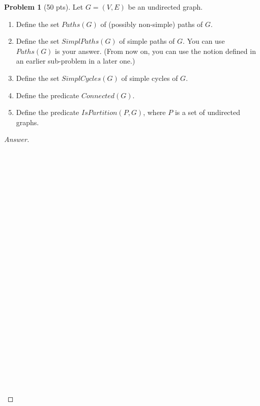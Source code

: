\documentclass[11pt,a4paper,oneside,microtype,nokorean]{oblivoir}
\theoremstyle{definition}
\newtheorem{problem}{Problem}
\begin{document}
\begin{problem}[50 pts]
  Let $G = (V,E)$ be an undirected graph.

  \begin{enumerate}
  \item Define the set $Paths(G)$ of (possibly non-simple) paths of $G$.
  \item Define the set $SimplPaths(G)$ of simple paths of $G$.  You can use $Paths(G)$ is your
    answer.  (From now on, you can use the notion defined in an earlier sub-problem in a later one.)
  \item Define the set $SimplCycles(G)$ of simple cycles of $G$.
  \item Define the predicate $Connected(G)$.
  \item Define the predicate $IsPartition(P, G)$, where $P$ is a set of undirected graphs.
  \end{enumerate}
\end{problem}
\begin{proof}[Answer]
  \ 
  \\
  \\
  \\
  \\
  \\
  \\
  \\
  \\
  \\
  \\
  \\
  \\
  \\
  \\
  \\
  \\
  \\
  \\
  \\
  \\
  \\
  \\
  \\
  \\
  \\
  \\
\end{proof}
\end{document}

